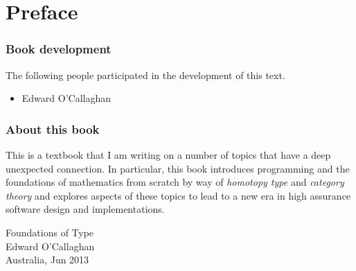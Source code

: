 %
%

\chapter*{Preface}
\label{cha:preface}


\subsection*{Book development}
The following people participated in the development of this text.

\begin{multicols}{2}{
\begin{itemize}
\item[] Edward O'Callaghan
\end{itemize}
}
\end{multicols}


\subsection*{About this book}

This is a textbook that I am writing on a number of topics that have a deep
unexpected connection. In particular, this book introduces programming and
the foundations of mathematics from scratch by way of
\emph{homotopy type} and \emph{category theory} and explores aspects of these
topics to lead to a new era in high assurance software design and implementations.

\bigskip

\begin{flushright}
Foundations of Type\\
Edward O'Callaghan\\
Australia, Jun 2013
\end{flushright}

